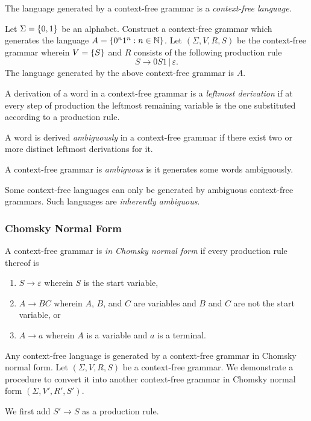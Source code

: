 The language generated by a context-free grammar is a \emph{context-free language}.

\Bxr
  Let \(\Sigma = \{0, 1\}\) be an alphabet. Construct a context-free grammar which generates the language \(A
  = \{0^n 1^n : n \in \mathbb{N}\}\).
\Exr
\Bsl
  Let \((\Sigma, V, R, S)\) be the context-free grammar wherein \(V = \{S\}\) and \(R\) consists of the following
  production rule
  \[
    S \to 0 S 1 \, | \, \varepsilon.
  \]
  The language generated by the above context-free grammar is \(A\).
\Esl

A derivation of a word in a context-free grammar is a \emph{leftmost derivation} if at every step of production the
leftmost remaining variable is the one substituted according to a production rule.

\Bdf
  A word is derived \emph{ambiguously} in a context-free grammar if there exist two or more distinct leftmost
  derivations for it.

  A context-free grammar is \emph{ambiguous} is it generates some words ambiguously.
\Edf

Some context-free languages can only be generated by ambiguous context-free grammars. Such languages are
\emph{inherently ambiguous}.

\subsubsection{Chomsky Normal Form}

\Bdf
  A context-free grammar is \emph{in Chomsky normal form} if every production rule thereof is
  \begin{enumerate}
    \item \(S \to \varepsilon\) wherein \(S\) is the start variable,
    \item \(A \to B C\) wherein \(A\), \(B\), and \(C\) are variables and \(B\) and \(C\) are not the start variable, or
    \item \(A \to a\) wherein \(A\) is a variable and \(a\) is a terminal.
  \end{enumerate}
\Edf

\Bth
  Any context-free language is generated by a context-free grammar in Chomsky normal form.
\Eth
\Bpr
  Let \((\Sigma, V, R, S)\) be a context-free grammar. We demonstrate a procedure to convert it into another
  context-free grammar in Chomsky normal form \((\Sigma, V', R', S')\).

  We first add \(S' \to S\) as a production rule.

